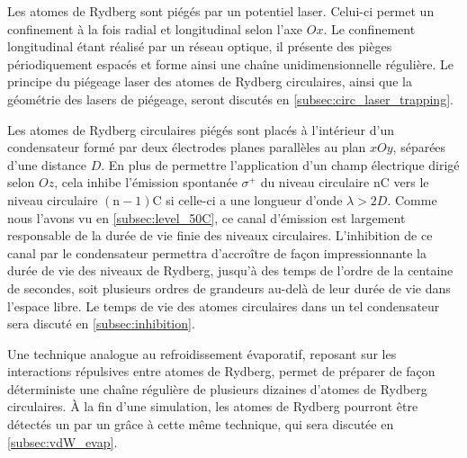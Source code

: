 Les atomes de Rydberg sont piégés par un potentiel laser.
Celui-ci permet un confinement à la fois radial et longitudinal selon l'axe $Ox$.
Le confinement longitudinal étant réalisé par un réseau optique, il présente des pièges périodiquement espacés et forme ainsi une chaîne unidimensionnelle régulière.
Le principe du piégeage laser des atomes de Rydberg circulaires, ainsi que la géométrie des lasers de piégeage, seront discutés en \ref{subsec:circ_laser_trapping}.

Les atomes de Rydberg circulaires piégés sont placés à l'intérieur d'un condensateur formé par deux électrodes planes parallèles au plan $xOy$, séparées d'une distance $D$.
En plus de permettre l'application d'un champ électrique dirigé selon $Oz$, cela inhibe l'émission spontanée $\sigma^+$ du niveau circulaire $\mathrm{nC}$ vers le niveau circulaire $\mathrm{(n-1)C}$ si celle-ci a une longueur d'onde $\lambda>2D$.
Comme nous l'avons vu en \ref{subsec:level_50C}, ce canal d'émission est largement responsable de la durée de vie finie des niveaux circulaires.
L'inhibition de ce canal par le condensateur permettra d'accroître de façon impressionnante la durée de vie des niveaux de Rydberg, jusqu'à des temps de l'ordre de la centaine de secondes, soit plusieurs ordres de grandeurs au-delà de leur durée de vie dans l'espace libre.
Le temps de vie des atomes circulaires dans un tel condensateur sera discuté en \ref{subsec:inhibition}.

Une technique analogue au refroidissement évaporatif, reposant sur les interactions répulsives entre atomes de Rydberg, permet de préparer de façon déterministe une chaîne régulière de plusieurs dizaines d'atomes de Rydberg circulaires.
\`A la fin d'une simulation, les atomes de Rydberg pourront être détectés un par un grâce à cette même technique, qui sera discutée en \ref{subsec:vdW_evap}.

